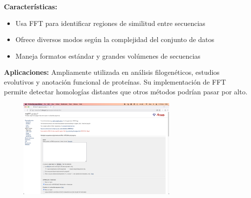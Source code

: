 \documentclass[11pt,a4paper]{article}
\begin{document}
	\noindent \textbf{Características:}
	\begin{itemize}[noitemsep,topsep=0pt,leftmargin=*]
		\item Usa FFT para identificar regiones de similitud entre secuencias
		\item Ofrece diversos modos según la complejidad del conjunto de datos
		\item Maneja formatos estándar y grandes volúmenes de secuencias
	\end{itemize}
	
	\pagebreak
	
	\noindent \textbf{Aplicaciones:} Ampliamente utilizada en análisis filogenéticos, estudios evolutivos y anotación funcional de proteínas. Su implementación de FFT permite detectar homologías distantes que otros métodos podrían pasar por alto.
	
		\begin{figure}[h]
		\centering
		\includegraphics[width=0.7\textwidth]{img/mafft.png}
	\end{figure}
\end{document}
